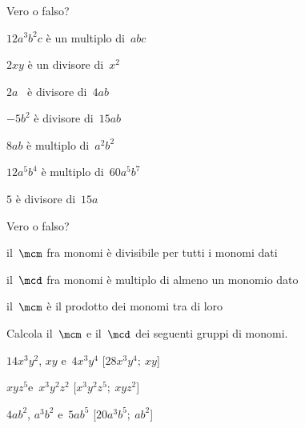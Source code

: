 \subsubsection*{}

\begin{esercizio}
 \label{ese:9.43}
Vero o falso?

\TabPositions{9cm}
\begin{enumeratea}
\item $12a^{3}b^{2}c$ è un multiplo di~$abc$ \tab\boxV\quad\boxF
\item $2xy$ è un divisore di~$x^{2}$ \tab\boxV\quad\boxF
\item $2a$ \ è divisore di~$4ab$ \tab\boxV\quad\boxF
\item $-5b^{2}$ è divisore di~$15ab$ \tab\boxV\quad\boxF
\item $8ab$ è multiplo di~$a^{2}b^{2}$ \tab\boxV\quad\boxF
\item $12a^{5}b^{4}$ è multiplo di~$60a^{5}b^{7}$ \tab\boxV\quad\boxF
\item $5$ è divisore di~$15a$ \tab\boxV\quad\boxF
\end{enumeratea}
\end{esercizio}

\begin{esercizio}
 \label{ese:9.44}
Vero o falso?

\TabPositions{10cm}
\begin{enumeratea}
\item il~$\mcm$ fra monomi è divisibile per tutti i monomi dati 
\tab\boxV\quad\boxF
\item il~$\mcd$ fra monomi è multiplo di almeno un monomio dato 
\tab\boxV\quad\boxF
\item il~$\mcm$ è il prodotto dei monomi tra di loro \tab\boxV\quad\boxF
\end{enumeratea}
\end{esercizio}

\begin{esercizio}[\Ast]
 \label{ese:9.45}
Calcola il~$\mcm$ e il~$\mcd$ dei seguenti gruppi di monomi.

\begin{enumeratea}
 \item $14x^{3}y^{2}$, $xy$ e~$4x^{3}y^{4}$ \hfill[$28x^{3}y^{4};~xy$]
 \item $xyz^{5}$e~$x^{3}y^{2}z^{2}$ \hfill[$x^{3}y^{2}z^{5};~xyz^{2}$]
 \item $4ab^{2}$, $a^{3}b^{2}$ e~$5ab^{5}$ \hfill[$20a^{3}b^{5};~ab^{2}$]
\end{enumeratea}
\end{esercizio}

